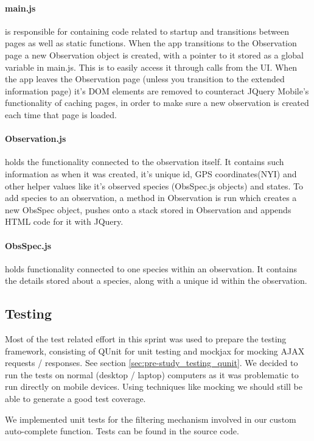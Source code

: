 \paragraph{main.js} is responsible for containing code related to startup and transitions between pages as well as static functions.
When the app transitions to the Observation page a new Observation object is created, with a pointer to it stored as a global variable in main.js.
This is to easily access it through calls from the UI.
When the app leaves the Observation page (unless you transition to the extended information page) it's DOM elements are removed to counteract JQuery Mobile's functionality of caching pages, in order to make sure a new observation is created each time that page is loaded.

\paragraph{Observation.js} holds the functionality connected to the observation itself.
It contains such information as when it was created, it's unique id, GPS coordinates(NYI) and other helper values like it's observed species (ObsSpec.js objects) and states.
To add species to an observation, a method in Observation is run which creates a new ObsSpec object, pushes onto a stack stored in Observation and appends HTML code for it with JQuery.

\paragraph{ObsSpec.js} holds functionality connected to one species within an observation.
It contains the details stored about a species, along with a unique id within the observation.

\subsection{Testing}
Most of the test related effort in this sprint was used to prepare the testing
framework, consisting of QUnit for unit testing and mockjax for mocking AJAX
requests / responses. See section \ref{sec:pre-study_testing_qunit}. We decided
to run the tests on normal (desktop / laptop) computers as it was problematic
to run directly on mobile devices. Using techniques like mocking we should
still be able to generate a good test coverage.

We implemented unit tests for the filtering mechanism involved in our custom
auto-complete function. Tests can be found in the source code.


